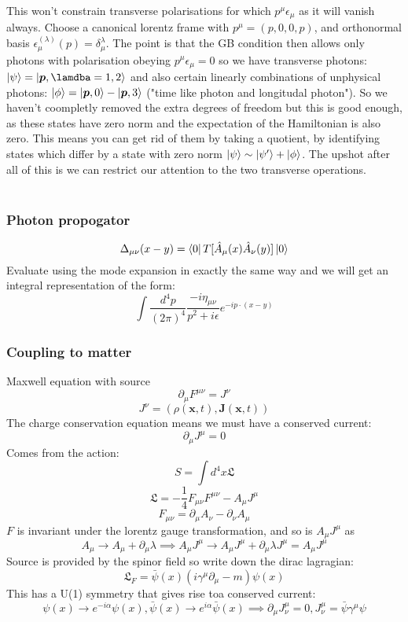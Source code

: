 \documentclass[12pt, a4paper, twoside, titlepage]{article}
\begin{document}
\begin{pmartix}
This won't constrain transverse polarisations for which $p^{\mu} \epsilon_{\mu}$ as it will vanish always. Choose a canonical lorentz frame with $p^{\mu} = (p,0,0,p)$, and orthonormal basis $\epsilon_{\mu}^{(\lambda)}(p) = \delta^{\lambda}_{\mu}$. The point is that the GB condition then allows only photons with polarisation obeying $p^{\mu}\epsilon_{\mu} = 0$ so we have transverse photons: $\ket{\psi} = \ket{\bm p, \lamdba = 1,2}$ and also certain linearly combinations of unphysical photons: $\ket{\phi} = \ket{\bm p, 0} - \ket{\bm p, 3}$ ("time like photon and longitudal photon"). So we haven't coompletly removed the extra degrees of freedom but this is good enough, as these states have zero norm and the expectation of the Hamiltonian is also zero. This means you can get rid of them by taking a quotient, by identifying states which differ by a state with zero norm $\ket{\psi} \sim \ket{\psi'} + \ket{\phi}$. The upshot after all of this is we can restrict our attention to the two transverse operations.\\\\
\subsubsection{Photon propogator}
$$
\Delta_{\mu \nu}(x - y) = \bra{0} T[\hat A_{\mu}(x) \hat A_{\nu}(y)] \ket{0}
$$
Evaluate using the mode expansion in exactly the same way and we will get an integral representation of the form:
$$
\int \frac{d^4 p}{(2 \pi)^4} \frac{-i \eta_{\mu \nu}}{p^2 + i\epsilon} e^{-i p\cdot (x-y)}
$$
\subsubsection{Coupling to matter}
Maxwell equation with source
$$
\partial_{\mu} F^{\mu \nu} =J^{\nu}
$$
$$
J^{\nu} = (\rho(\bm x,t), \bm J(\bm x,t))
$$
The charge conservation equation means we must have a conserved current:
$$
\partial_{\mu} J^{\mu} = 0
$$
Comes from the action:
$$
S = \int d^4 x \mathfrak{L}
$$
$$
\mathfrak{L} = - \frac{1}{4} F_{\mu \nu} F^{\mu \nu} - A_{\mu} J^{\mu}
$$
$$
F_{\mu \nu} = \partial_{\mu} A_{\nu} - \partial_{\nu} A_{\mu}
$$
$F$ is invariant under the lorentz gauge transformation, and so is $A_{\mu}J^{\mu}$ as
$$
A_{\mu} \rightarrow A_{\mu} + \partial_{\mu} \lambda \implies A_{\mu}J^{\mu} \rightarrow A_{\mu}J^{\mu} + \partial_{\mu} \lambda J^{\mu} = A_{\mu} J^{\mu}
$$
Source is provided by the spinor field so write down the dirac lagragian:
$$
\mathfrak{L}_F = \bar \psi(x) (i \gamma^{\mu}\partial_{\mu} - m) \psi(x)
$$
This has a U(1) symmetry that gives rise toa conserved current:
$$
\psi (x) \rightarrow e^{-i\alpha} \psi(x), \bar \psi(x) \rightarrow e^{i\alpha} \bar \psi (x) \implies \partial_{\mu} J^{\mu}_{\nu} = 0, J^{\mu}_{\nu} = \bar \psi \gamma^{\mu} \psi 
$$

\end{pmartix}
\end{document}
